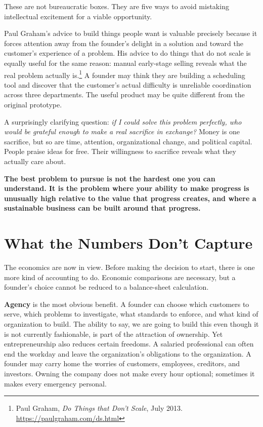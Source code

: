 These are not bureaucratic boxes. They are five ways to avoid mistaking intellectual excitement for a viable opportunity.

Paul Graham's advice to build things people want is valuable precisely because it forces attention away from the founder's delight in a solution and toward the customer's experience of a problem. His advice to do things that do not scale is equally useful for the same reason: manual early-stage selling reveals what the real problem actually is.\footnote{Paul Graham, \emph{Do Things that Don't Scale}, July 2013. \url{https://paulgraham.com/ds.html}} A founder may think they are building a scheduling tool and discover that the customer's actual difficulty is unreliable coordination across three departments. The useful product may be quite different from the original prototype.

A surprisingly clarifying question: \emph{if I could solve this problem perfectly, who would be grateful enough to make a real sacrifice in exchange?} Money is one sacrifice, but so are time, attention, organizational change, and political capital. People praise ideas for free. Their willingness to sacrifice reveals what they actually care about.

\textbf{The best problem to pursue is not the hardest one you can understand. It is the problem where your ability to make progress is unusually high relative to the value that progress creates, and where a sustainable business can be built around that progress.}

\section{What the Numbers Don't Capture}
\label{sec:ch01-beyond-the-numbers}

The economics are now in view. Before making the decision to start, there is one more kind of accounting to do. Economic comparisons are necessary, but a founder's choice cannot be reduced to a balance-sheet calculation.

\textbf{Agency} is the most obvious benefit. A founder can choose which customers to serve, which problems to investigate, what standards to enforce, and what kind of organization to build. The ability to say, we are going to build this even though it is not currently fashionable, is part of the attraction of ownership. Yet entrepreneurship also reduces certain freedoms. A salaried professional can often end the workday and leave the organization's obligations to the organization. A founder may carry home the worries of customers, employees, creditors, and investors. Owning the company does not make every hour optional; sometimes it makes every emergency personal.


